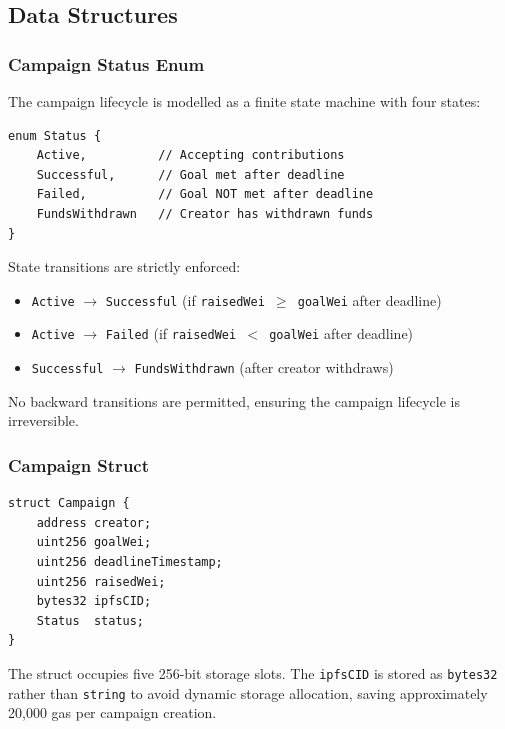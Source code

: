 \subsection{Data Structures}

\subsubsection{Campaign Status Enum}

The campaign lifecycle is modelled as a finite state machine with four states:

\begin{lstlisting}[language=Solidity, caption={Status Enum}]
enum Status {
    Active,          // Accepting contributions
    Successful,      // Goal met after deadline
    Failed,          // Goal NOT met after deadline
    FundsWithdrawn   // Creator has withdrawn funds
}
\end{lstlisting}

State transitions are strictly enforced:
\begin{itemize}[leftmargin=1.5em]
    \item \texttt{Active} $\rightarrow$ \texttt{Successful} (if \texttt{raisedWei $\geq$ goalWei} after deadline)
    \item \texttt{Active} $\rightarrow$ \texttt{Failed} (if \texttt{raisedWei $<$ goalWei} after deadline)
    \item \texttt{Successful} $\rightarrow$ \texttt{FundsWithdrawn} (after creator withdraws)
\end{itemize}

No backward transitions are permitted, ensuring the campaign lifecycle is irreversible.

\subsubsection{Campaign Struct}

\begin{lstlisting}[language=Solidity, caption={Campaign Struct}]
struct Campaign {
    address creator;
    uint256 goalWei;
    uint256 deadlineTimestamp;
    uint256 raisedWei;
    bytes32 ipfsCID;
    Status  status;
}
\end{lstlisting}

The struct occupies five 256-bit storage slots. The \texttt{ipfsCID} is stored as \texttt{bytes32} rather than \texttt{string} to avoid dynamic storage allocation, saving approximately 20,000 gas per campaign creation.

